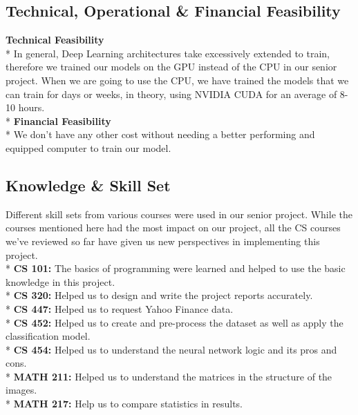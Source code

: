 \documentclass[]{article}
\begin{document}
\subsection{Technical, Operational \& Financial Feasibility}
\textbf{Technical Feasibility} \vspace{0.1cm}\\*
In general, Deep Learning architectures take excessively extended to train, therefore we trained our models on the GPU instead of the CPU in our senior project. When we are going to use the CPU, we have trained the models that we can train for days or weeks, in theory, using NVIDIA CUDA for an average of 8-10 hours.\vspace{0.2cm}\\*
\textbf{Financial Feasibility} \vspace{0.1cm}\\*
We don't have any other cost without needing a better performing and equipped computer to train our model.
\subsection{Knowledge \& Skill Set}
Different skill sets from various courses were used in our senior project. While the courses mentioned here had the most impact on our project, all the CS courses we've reviewed so far have given us new perspectives in implementing this project.\vspace{0.2cm} \\*
\textbf{CS 101:} The basics of programming were learned and helped to use the basic knowledge in this project.\vspace{0.1cm} \\*
\textbf{CS 320:} Helped us to design and write the project reports accurately.\vspace{0.1cm}\\*
\textbf{CS 447:} Helped us to request Yahoo Finance data. \vspace{0.1cm}\\*
\textbf{CS 452:} Helped us to create and pre-process the dataset as well as apply the classification model. \vspace{0.1cm}\\*
\textbf{CS 454:} Helped us to understand the neural network logic and its pros and cons. \vspace{0.1cm}\\*
\textbf{MATH 211:} Helped us to understand the matrices in the structure of the images. \vspace{0.1cm} \\*
\textbf{MATH 217:} Help us to compare statistics in results.
\end{document}
